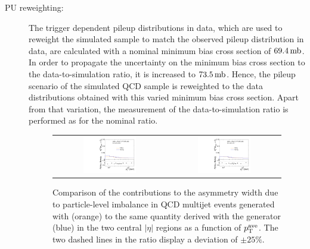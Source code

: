 \begin{description}
 \item[PU reweighting:] The trigger dependent pileup distributions in data, which are used to reweight the simulated sample to match the observed pileup distribution in data, are calculated with a nominal minimum bias cross section of $69.4\,\rm{mb}$. In order to propagate the uncertainty on the minimum bias cross section to the data-to-simulation ratio, it is increased to $73.5\,\rm{mb}$. Hence, the pileup scenario of the simulated \pythia QCD sample is reweighted to the data distributions obtained with this varied minimum bias cross section. Apart from that variation, the measurement of the data-to-simulation ratio is performed as for the nominal ratio. \\
\begin{figure}[!tp]
  \centering
  \begin{tabular}{cc}
                \includegraphics[width=0.49\textwidth]{figures/PLI_comparison_Eta0_v4.pdf} &
                \includegraphics[width=0.49\textwidth]{figures/PLI_comparison_Eta1_v4.pdf} \\
  \end{tabular}
  \caption{Comparison of the contributions to the asymmetry width due to particle-level imbalance in QCD multijet events generated with \pythia (orange) to the same quantity derived with the \herwig generator (blue) in the two central $|\eta|$ regions as a function of $p_{\text{T}}^\mathrm{ave}$. The two dashed lines in the ratio display a deviation of $\pm 25\%$.}
  \label{fig:pli_comp}
\end{figure}
 

\end{description}
